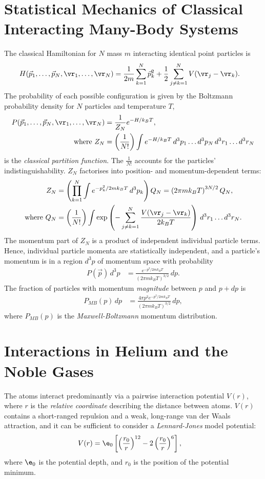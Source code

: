 \documentclass[qo.tex]{subfiles}
\begin{document}
\section{Statistical Mechanics of Classical Interacting Many-Body Systems}
The classical Hamiltonian for $N$ mass $m$ interacting identical point particles is
\begin{align}
    H(\vec{p}_1,\dots,\vec{p}_N,\vr_1,\dots,\vr_N) &= \frac{1}{2m}\sum_{k=1}^N \vec{p}_k^2 + \frac12\sum_{j\neq k=1}^N V(\vr_j-\vr_k).
\end{align}
The probability of each possible configuration is given by the Boltzmann probability density for $N$ particles and temperature $T$,
\begin{align}
    P(\vec{p}_1,\dots,\vec{p}_N,\vr_1,\dots,\vr_N) &= \frac{1}{Z_N}e^{-H/k_BT}, \\ 
    \text{where } Z_N &= \left(\frac{1}{N!}\right)\int e^{-H/k_BT}\,d^3p_1\dots d^3p_N\,d^3r_1\dots d^3r_N
\end{align}
is the \emph{classical partition function}. 
The $\frac{1}{N!}$ accounts for the particles' indistinguishability. 
$Z_N$ factorises into position- and momentum-dependent terms:
\begin{align}
    Z_N &= \left(\prod_{k=1}^N \int e^{-p_k^2/2mk_BT}\,d^3p_k\right)Q_N = \left(2\pi mk_BT\right)^{3N/2}Q_N, \\
    \text{where } Q_N &= \left(\frac{1}{N!}\right)\int \exp\left(-\sum_{j\neq k=1}^N \frac{V(\vr_j-\vr_k)}{2k_BT}\right)\,d^3r_1\dots d^3r_N.
\end{align}
The momentum part of $Z_N$ is a product of independent individual particle terms. 
Hence, individual particle momenta are statistically independent, and a particle's momentum is in a region $d^3p$ of momentum space with probability
\begin{align}
    P(\vec{p})\,d^3p &= \frac{e^{-p^2/2mk_BT}}{(2\pi mk_BT)^{3/2}}\,dp.
\end{align}
The fraction of particles with momentum \emph{magnitude} between $p$ and $p+dp$ is
\begin{align}
    P_{MB}(p)\,dp &= \frac{4\pi p^2e^{-p^2/2mk_BT}}{(2\pi mk_BT)^{3/2}}\,dp,
\end{align}
where $P_{MB}(p)$ is the \emph{Maxwell-Boltzmann} momentum distribution.

\section{Interactions in Helium and the Noble Gases}
The atoms interact predominantly via a pairwise interaction potential $V(r)$, where $r$ is the \emph{relative coordinate} describing the distance between atoms.
$V(r)$ contains a short-ranged repulsion and a weak, long-range van der Waals attraction, and it can be sufficient to consider a \emph{Lennard-Jones} model potential:
\begin{align}
    V(r) &= \e_0\left[\left(\frac{r_0}{r}\right)^{12}-2\left(\frac{r_0}{r}\right)^6\right],
\end{align}
where $\e_0$ is the potential depth, and $r_0$ is the position of the potential minimum.
\end{document}
